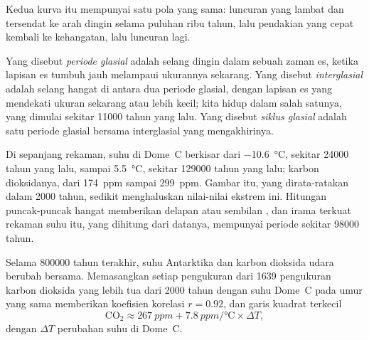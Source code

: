 Kedua kurva itu mempunyai satu pola yang sama: luncuran yang lambat dan
tersendat ke arah dingin selama puluhan ribu tahun, lalu pendakian yang cepat
kembali ke kehangatan, lalu luncuran lagi.

\begin{definition}\label{def:g12:past-climates:glacial-cycle}
Yang disebut \emph{periode glasial} adalah selang dingin
dalam sebuah zaman es, ketika lapisan es tumbuh jauh melampaui ukurannya
sekarang. Yang disebut \emph{interglasial} adalah selang
hangat di antara dua periode glasial, dengan lapisan es yang mendekati ukuran
sekarang atau lebih kecil; kita hidup dalam salah satunya, yang dimulai sekitar
\num{11000} tahun yang lalu. Yang disebut \emph{siklus
glasial} adalah satu periode glasial bersama interglasial
yang mengakhirinya.
\end{definition}

Di sepanjang rekaman, suhu di Dome~C berkisar dari
\qty{-10.6}{\degreeCelsius}, sekitar \num{24000} tahun yang lalu, sampai
\qty{+5.5}{\degreeCelsius}, sekitar \num{129000} tahun yang lalu; karbon
dioksidanya, dari \qty{174}{ppm} sampai \qty{299}{ppm}. Gambar itu, yang
dirata-ratakan dalam \num{2000} tahun, sedikit menghaluskan nilai-nilai ekstrem
ini. Hitungan puncak-puncak hangat memberikan delapan atau sembilan , dan irama terkuat rekaman suhu itu, yang dihitung dari datanya,
mempunyai periode sekitar \num{98000} tahun.

\begin{proposition}\label{prop:g12:past-climates:correlation}
Selama \num{800000} tahun terakhir, suhu Antarktika dan karbon dioksida udara
berubah bersama. Memasangkan setiap pengukuran dari 1639 pengukuran karbon
dioksida yang lebih tua dari \num{2000} tahun dengan suhu Dome~C pada umur yang
sama memberikan koefisien korelasi $r = 0.92$, dan garis kuadrat terkecil
\[
  \mathrm{CO_2} \approx \qty{267}{ppm} + \qty{7.8}{ppm/\degreeCelsius} \times \Delta T ,
\]
dengan $\Delta T$ perubahan suhu di Dome~C.
\end{proposition}

